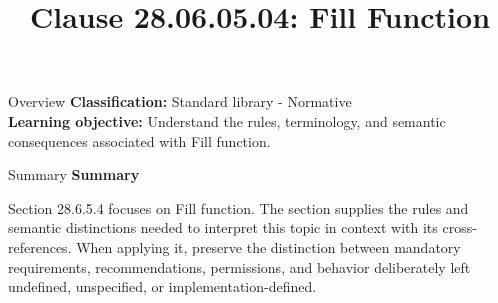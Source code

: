 \documentclass[10pt,letterpaper]{article}
\title{Clause 28.06.05.04: Fill Function}
\author{}
\date{}
\begin{document}
\maketitle
\begin{CornellOverviewBox}{Overview}
\textbf{Classification:} Standard library - Normative\\[2pt]
\textbf{Learning objective:} Understand the rules, terminology, and semantic consequences associated with Fill function.
\end{CornellOverviewBox}\begin{CornellSummaryBox}{Summary}
{\sffamily\bfseries\color{Accent} Summary}\par\vspace{3pt}Section 28.6.5.4 focuses on Fill function. The section supplies the rules and semantic distinctions needed to interpret this topic in context with its cross-references. When applying it, preserve the distinction between mandatory requirements, recommendations, permissions, and behavior deliberately left undefined, unspecified, or implementation-defined.
\end{CornellSummaryBox}
\end{document}
